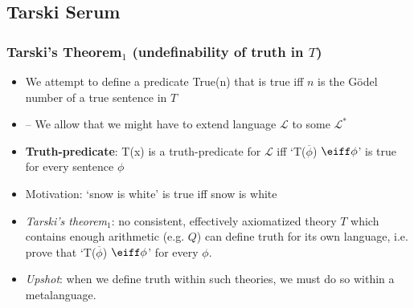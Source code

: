 \subsection{\phantom{v} Tarski Serum}

\begin{frame}
\frametitle{Tarski's Theorem$_1$ (undefinability of truth in $T$)}

\begin{itemize}[<+->]


\item We attempt to define a predicate \textrm{True(n)} that is true iff $n$ is the G\"odel number of a true sentence in $T$ 
\item[] -- We allow that we might have to extend language $\mathcal{L}$ to some $\mathcal{L}^{\ast}$

\item \textbf{Truth-predicate}: \textrm{T(x)} is a truth-predicate for $\mathcal{L}$ iff `\textrm{T}($\overline{\phi}$) $\eiff \phi$' is true for every sentence $\phi$
\item[] Motivation: `snow is white' is true iff snow is white 

\item \emph{Tarski's theorem$_1$}: no consistent, effectively axiomatized theory $T$ which contains enough arithmetic (e.g. $Q$) can define truth for its own language, i.e. prove that `\textrm{T}($\overline{\phi}$) $\eiff \phi$' for every $\phi$. 

\item \textit{Upshot}: when we define truth within such theories, we must do so within a metalanguage. 

\end{itemize}
\end{frame}

